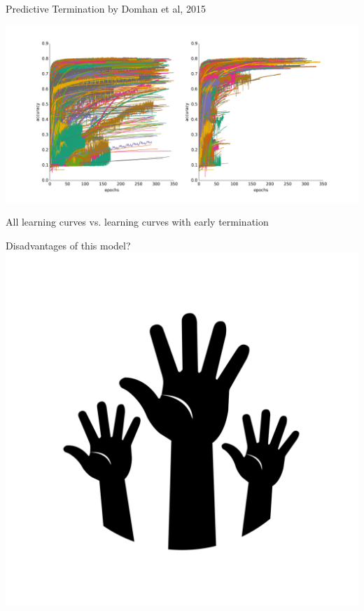 \begin{frame}[c,fragile]{Predictive Termination by Domhan et al, 2015}

\centering
\includegraphics[width=\textwidth]{images/learning_curve_tuning}

All learning curves vs. learning curves with early termination
\pause

Disadvantages of this model? \includegraphics[height=0.1\textheight]{images/hands.png}

\end{frame}


